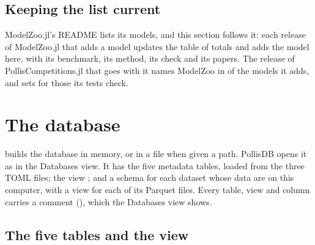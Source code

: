 \subsection{Keeping the list current}

ModelZoo.jl's README lists its models, and this section follows it: each release of ModelZoo.jl that adds a model
updates the table of totals and adds the model here, with its benchmark, its method, its check and its papers. The
release of PollisCompetitions.jl that goes with it names ModelZoo in  of the models it adds, and
sets  for those its tests check.

\section{The database}
\label{sec:database}

 builds the database in memory, or in a file when given a path. PollisDB opens it as
 in the Databases view. It has the five metadata tables, loaded from the three TOML files;
the view ; and a schema for each dataset whose data are on this computer, with a view for each
of its Parquet files. Every table, view and column carries a comment (), which the Databases view
shows.

\subsection{The five tables and the view}


